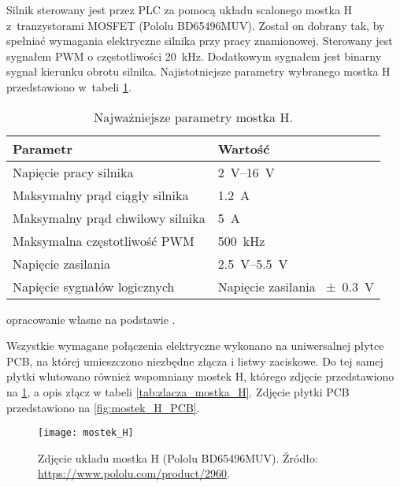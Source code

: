 Silnik sterowany jest przez PLC za pomocą układu scalonego mostka H z~tranzystorami MOSFET (Pololu BD65496MUV). Został on dobrany tak, by spełniać wymagania elektryczne silnika przy pracy znamionowej. Sterowany jest sygnałem PWM o częstotliwości \SI{20}{\kilo\hertz}. Dodatkowym sygnałem jest binarny sygnał kierunku obrotu silnika. Najistotniejsze parametry wybranego mostka H przedstawiono w~tabeli \ref{tab:parametry_mostka_H}.

\begin{table}[H]
    \centering
    \begin{threeparttable}
        \caption{Najważniejsze parametry mostka H.}
        \label{tab:parametry_mostka_H}
        
        \begin{tabularx}{0.7\textwidth}{l | l}
            \toprule
            Parametr & Wartość \\
            \midrule
            Napięcie pracy silnika & \SIrange{2}{16}{\volt} \\
            Maksymalny prąd ciągły silnika & \SI{1,2}{\ampere} \\
            Maksymalny prąd chwilowy silnika & \SI{5}{\ampere} \\
            Maksymalna częstotliwość PWM & \SI{500}{\kilo\hertz} \\
            Napięcie zasilania & \SIrange{2,5}{5,5}{\volt} \\
            Napięcie sygnałów logicznych & Napięcie zasilania \SI{+-0,3}{\volt} \\
            \bottomrule
        \end{tabularx}
        
        \begin{tablenotes}
            \footnotesize
            \item[a] opracowanie własne na podstawie \cite{MOSTEK_H_MANUAL}.
        \end{tablenotes}
    \end{threeparttable}
\end{table}

Wszystkie wymagane połączenia elektryczne wykonano na uniwersalnej płytce PCB, na której umieszczono niezbędne złącza i listwy zaciskowe. Do tej samej płytki wlutowano również wspomniany mostek H, którego zdjęcie przedstawiono na \cref{fig:zdjecie_mostka_H}, a opis złącz w tabeli \ref{tab:zlacza_mostka_H}. Zdjęcie płytki PCB przedstawiono na \cref{fig:mostek_H_PCB}.

\begin{figure}[h]
    \centering
    \texttt{[image: mostek\_H]}
    \caption{Zdjęcie układu mostka H (Pololu BD65496MUV). Źródło: \url{https://www.pololu.com/product/2960}.}
    \label{fig:zdjecie_mostka_H}
\end{figure}

